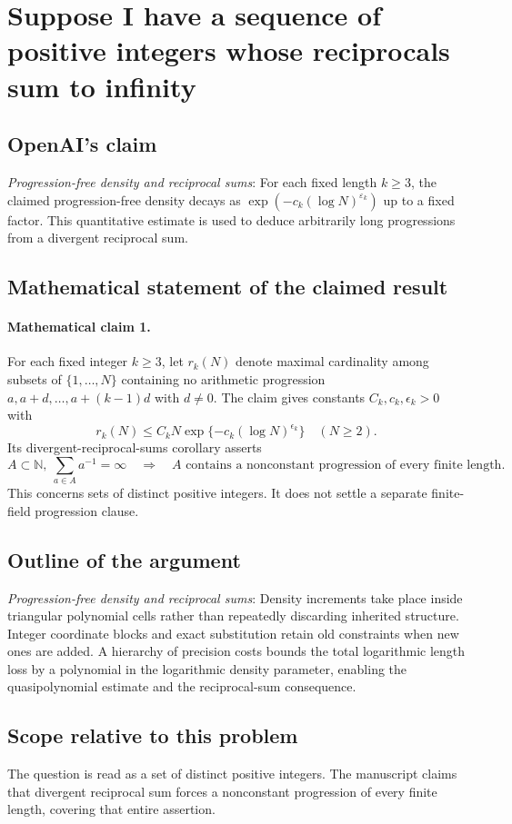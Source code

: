\documentclass[11pt]{article}
\begin{document}
\section*{Suppose I have a sequence of positive integers whose reciprocals sum to infinity}

\subsection{OpenAI's claim}
\textit{Progression-free density and reciprocal sums}: For each fixed length $k\ge3$, the claimed progression-free density decays as $\exp(-c_k(\log N)^{\varepsilon_k})$ up to a fixed factor. This quantitative estimate is used to deduce arbitrarily long progressions from a divergent reciprocal sum.

\subsection{Mathematical statement of the claimed result}
\paragraph{Mathematical claim 1.} For each fixed integer $k\ge3$, let $r_k(N)$ denote maximal cardinality among subsets of $\{1,\ldots,N\}$ containing no arithmetic progression $a,a+d,\ldots,a+(k-1)d$ with $d\ne0$. The claim gives constants $C_k,c_k,\epsilon_k>0$ with \[r_k(N)\le C_kN\exp\{-c_k(\log N)^{\epsilon_k}\}\quad(N\ge2).\] Its divergent-reciprocal-sums corollary asserts \[A\subset\mathbb N,\ \sum_{a\in A}a^{-1}=\infty\quad\Longrightarrow\quad A\text{ contains a nonconstant progression of every finite length}.\] This concerns sets of distinct positive integers. It does not settle a separate finite-field progression clause.

\subsection{Outline of the argument}
\textit{Progression-free density and reciprocal sums}: Density increments take place inside triangular polynomial cells rather than repeatedly discarding inherited structure. Integer coordinate blocks and exact substitution retain old constraints when new ones are added. A hierarchy of precision costs bounds the total logarithmic length loss by a polynomial in the logarithmic density parameter, enabling the quasipolynomial estimate and the reciprocal-sum consequence.

\subsection{Scope relative to this problem}
The question is read as a set of distinct positive integers. The manuscript claims that divergent reciprocal sum forces a nonconstant progression of every finite length, covering that entire assertion.
\end{document}
